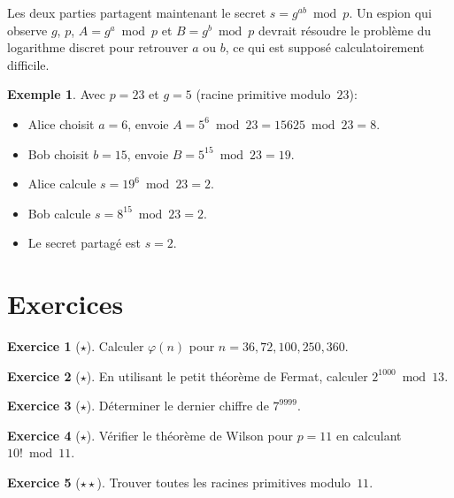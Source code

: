 \documentclass[12pt,a4paper,openany]{book}
\theoremstyle{definition}
\newtheorem{exemple}[definition]{Exemple}
\newtheorem{exercice}{Exercice}[chapter]
\theoremstyle{plain}
\theoremstyle{remark}
\begin{document}
Les deux parties partagent maintenant le secret $s = g^{ab} \bmod p$. Un
espion qui observe $g$, $p$, $A = g^a \bmod p$ et $B = g^b \bmod p$
devrait résoudre le problème du logarithme discret
pour retrouver $a$ ou $b$, ce qui est supposé calculatoirement difficile.

\begin{exemple}
\label{ex:DH}
Avec $p = 23$ et $g = 5$ (racine primitive modulo~$23$):
\begin{itemize}
  \item Alice choisit $a = 6$, envoie $A = 5^6 \bmod 23 = 15625 \bmod 23 = 8$.
  \item Bob choisit $b = 15$, envoie $B = 5^{15} \bmod 23 = 19$.
  \item Alice calcule $s = 19^6 \bmod 23 = 2$.
  \item Bob calcule $s = 8^{15} \bmod 23 = 2$.
  \item Le secret partagé est $s = 2$.
\end{itemize}
\end{exemple}

\section{Exercices}
\label{sec:few-exo}

\begin{exercice}[$\star$]
\label{exo:few-1}
Calculer $\varphi(n)$ pour $n = 36, 72, 100, 250, 360$.
\end{exercice}

\begin{exercice}[$\star$]
\label{exo:few-2}
En utilisant le petit théorème de Fermat, calculer $2^{1000} \bmod 13$.
\end{exercice}

\begin{exercice}[$\star$]
\label{exo:few-3}
Déterminer le dernier chiffre de $7^{9999}$.
\end{exercice}

\begin{exercice}[$\star$]
\label{exo:few-4}
Vérifier le théorème de Wilson pour $p = 11$ en calculant $10! \bmod 11$.
\end{exercice}

\begin{exercice}[$\star\star$]
\label{exo:few-5}
Trouver toutes les racines primitives modulo~$11$.
\end{exercice}
\end{document}
